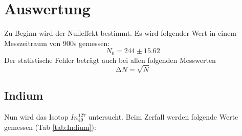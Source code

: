 \section{Auswertung}
Zu Beginn wird der Nulleffekt bestimmt. Es wird folgender Wert in einem Messzeitraum von  900s gemessen:
\begin{equation*}
	N_0 = 244 \pm 15.62
\end{equation*}
Der statistische Fehler beträgt auch bei allen folgenden Messwerten 
\begin{equation}
\label{eq:fehler}
	\increment N = \sqrt{N}
\end{equation}

\subsection{Indium}
Nun wird das Isotop $In^{127}_{49}$ untersucht. Beim Zerfall werden folgende Werte gemessen (Tab \ref{tab:Indium}):

